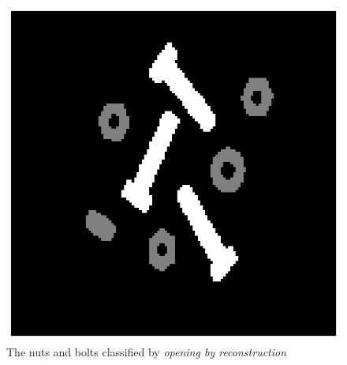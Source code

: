 
\begin{figure}[htb]
 \centering
 \includegraphics[width=\linewidth]{classification.eps}
 \caption{The nuts and bolts classified by \textit{opening by reconstruction}}
 \label{fig:classification}
\end{figure}


\clearpage